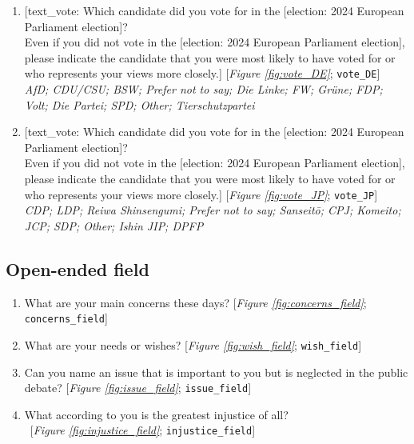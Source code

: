 \begin{enumerate}[resume]
\item  \label{q:vote_DE} [text\_vote: Which candidate did you vote for in the [election: 2024 European Parliament election]?\\Even if you did not vote in the [election: 2024 European Parliament election], please indicate the candidate that you were most likely to have voted for or who represents your views more closely.] [\textit{Figure \ref{fig:vote_DE}}; 
\verb|vote_DE|]
  \\ \textit{AfD; CDU/CSU; BSW; Prefer not to say; Die Linke; FW; Grüne; FDP; Volt; Die Partei; SPD; Other; Tierschutzpartei}

\item  \label{q:vote_JP} [text\_vote: Which candidate did you vote for in the [election: 2024 European Parliament election]?\\Even if you did not vote in the [election: 2024 European Parliament election], please indicate the candidate that you were most likely to have voted for or who represents your views more closely.] [\textit{Figure \ref{fig:vote_JP}}; 
\verb|vote_JP|]
  \\ \textit{CDP; LDP; Reiwa Shinsengumi; Prefer not to say; Sanseitō; CPJ; Komeito; JCP; SDP; Other; Ishin JIP; DPFP}

\end{enumerate} 

 \subsection*{Open-ended field} 
 \begin{enumerate}[resume] 
\item  \label{q:concerns_field} What are your main concerns these days? [\textit{Figure \ref{fig:concerns_field}}; 
\verb|concerns_field|]


\item  \label{q:wish_field} What are your needs or wishes? [\textit{Figure \ref{fig:wish_field}}; 
\verb|wish_field|]


\item  \label{q:issue_field} Can you name an issue that is important to you but is neglected in the public debate? [\textit{Figure \ref{fig:issue_field}}; 
\verb|issue_field|]


\item  \label{q:injustice_field} What according to you is the greatest injustice of all?\\ 
~[\textit{Figure \ref{fig:injustice_field}}; 
\verb|injustice_field|]


\end{enumerate} 


